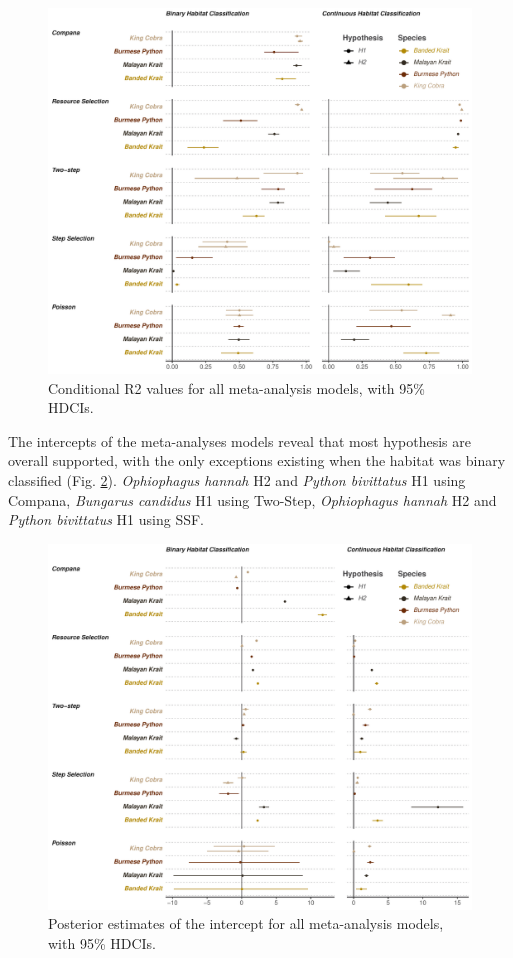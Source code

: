 \documentclass[10pt,a4paper]{article}
\begin{document}
\begin{figure}
\includegraphics[width=1\linewidth]{../../figures/r2Plot} \caption{Conditional R2 values for all meta-analysis models, with 95\% HDCIs.}\label{fig:metaR2Plot}
\end{figure}

The intercepts of the meta-analyses models reveal that most hypothesis are overall supported, with the only exceptions existing when the habitat was binary classified (Fig. \ref{fig:metaInterPlot}).
\emph{Ophiophagus hannah} H2 and \emph{Python bivittatus} H1 using Compana, \emph{Bungarus candidus} H1 using Two-Step, \emph{Ophiophagus hannah} H2 and \emph{Python bivittatus} H1 using SSF.

\begin{figure}
\includegraphics[width=1\linewidth]{../../figures/metaIntercept} \caption{Posterior estimates of the intercept for all meta-analysis models, with 95\% HDCIs.}\label{fig:metaInterPlot}
\end{figure}
\end{document}
